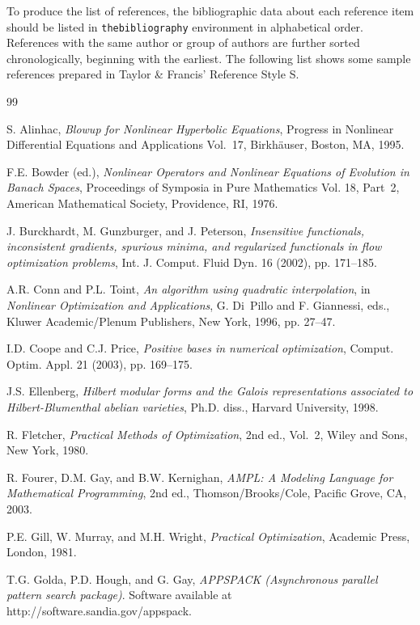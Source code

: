 \documentclass[]{interact}
\theoremstyle{plain}%
\theoremstyle{definition}
\theoremstyle{remark}
\begin{document}
To produce the list of references, the bibliographic data about each reference item should be listed in \texttt{thebibliography} environment in alphabetical order. References with the same author or group of authors are further sorted chronologically, beginning with the earliest. The following list shows some sample references prepared in Taylor \& Francis' Reference Style S.

\begin{thebibliography}{99}

S. Alinhac, \emph{Blowup for Nonlinear Hyperbolic Equations}, Progress in
  Nonlinear Differential Equations and Applications Vol.~17, Birkh{\"a}user,
  Boston, MA, 1995.

F.E. Bowder (ed.), \emph{Nonlinear Operators and Nonlinear Equations of
  Evolution in Banach Spaces}, Proceedings of Symposia in Pure Mathematics
  Vol. 18, Part~2, American Mathematical Society, Providence, RI, 1976.

J. Burckhardt, M. Gunzburger, and J. Peterson, \emph{Insensitive functionals,
  inconsistent gradients, spurious minima, and regularized functionals in flow
  optimization problems}, Int. J. Comput. Fluid Dyn. 16 (2002), pp. 171--185.

A.R. Conn and P.L. Toint, \emph{An algorithm using quadratic interpolation}, in
  \emph{Nonlinear Optimization and Applications}, G. Di~Pillo and F. Giannessi,
  eds., Kluwer Academic/Plenum Publishers, New York, 1996, pp. 27--47.

I.D. Coope and C.J. Price, \emph{Positive bases in numerical optimization},
  Comput. Optim. Appl. 21 (2003), pp. 169--175.

J.S. Ellenberg, \emph{Hilbert modular forms and the Galois representations
  associated to Hilbert-Blumenthal abelian varieties}, Ph.D. diss., Harvard
  University, 1998.

R. Fletcher, \emph{Practical Methods of Optimization}, 2nd ed., Vol.~2, Wiley
  and Sons, New York, 1980.

R. Fourer, D.M. Gay, and B.W. Kernighan, \emph{AMPL: A Modeling Language for
  Mathematical Programming}, 2nd ed., Thomson/Brooks/Cole, Pacific Grove, CA,
  2003.

P.E. Gill, W. Murray, and M.H. Wright, \emph{Practical Optimization}, Academic
  Press, London, 1981.

T.G. Golda, P.D. Hough, and G. Gay, \emph{APPSPACK (Asynchronous parallel
  pattern search package)}. Software available at
  http://software.sandia.gov/appspack.


\end{thebibliography}
\end{document}
